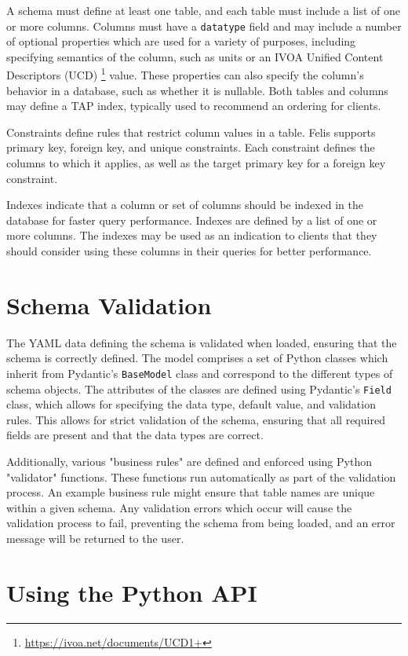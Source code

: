 \documentclass[11pt,twoside]{article}
\begin{document}
A schema must define at least one table, and each table must include a list of one or more columns.
Columns must have a \texttt{datatype} field and may include a number of optional properties which are used for a variety of purposes, including specifying semantics of the column, such as units or an IVOA Unified Content Descriptors (UCD) \footnote{\url{https://ivoa.net/documents/UCD1+}} value.
These properties can also specify the column's behavior in a database, such as whether it is nullable.
Both tables and columns may define a TAP index, typically used to recommend an ordering for clients.

Constraints define rules that restrict column values in a table.
Felis supports primary key, foreign key, and unique constraints.
Each constraint defines the columns to which it applies, as well as the target primary key for a foreign key constraint.

Indexes indicate that a column or set of columns should be indexed in the database for faster query performance.
Indexes are defined by a list of one or more columns.
The indexes may be used as an indication to clients that they should consider using these columns in their queries for better performance.

\section{Schema Validation}
The YAML data defining the schema is validated when loaded, ensuring that the schema is correctly defined.
The model comprises a set of Python classes which inherit from Pydantic's \texttt{BaseModel} class and correspond to the different types of schema objects.
The attributes of the classes are defined using Pydantic's \texttt{Field} class, which allows for specifying the data type, default value, and validation rules.
This allows for strict validation of the schema, ensuring that all required fields are present and that the data types are correct.

Additionally, various "business rules" are defined and enforced using Python "validator" functions.
These functions run automatically as part of the validation process.
An example business rule might ensure that table names are unique within a given schema.
Any validation errors which occur will cause the validation process to fail, preventing the schema from being loaded, and an error message will be returned to the user.

\section{Using the Python API}
\end{document}
